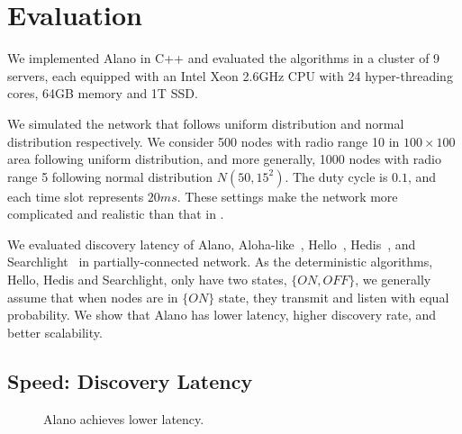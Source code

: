 \section{Evaluation}
\label{Evaluation}


We implemented Alano in C++ and evaluated the algorithms in a cluster of 9 servers, 
each equipped with an Intel Xeon 2.6GHz CPU with 24 hyper-threading cores, 64GB memory and 1T SSD. 

We simulated the network that follows uniform distribution and normal distribution respectively. 
We consider 500 nodes with radio range 10 in $100\times100$ area following uniform distribution, 
and more generally, 1000 nodes with radio range 5 following normal distribution $N(50, 15^2)$. 
The duty cycle is $0.1$, and each time slot represents $20ms$. 
These settings make the network more complicated and realistic than that in 
\cite{wang2015blinddate, qiu2016talk, sun2014hello, bakht2012searchlight, 
chen2015heterogeneous, kandhalu2010u, you2011aloha, 
mcglynn2001birthday, song2014probabilistic, vasudevan2009neighbor}.



We evaluated discovery latency of Alano, Aloha-like~\cite{you2011aloha}, Hello~\cite{sun2014hello}, Hedis~\cite{chen2015heterogeneous}, and Searchlight~\cite{bakht2012searchlight} in partially-connected network. As the deterministic algorithms, Hello, Hedis and Searchlight, only have two states, $\{ON, OFF\}$, we generally assume that when nodes are in $\{ON\}$ state, they transmit and listen with equal probability.
We show that Alano has lower latency, higher discovery rate, and better scalability.

\subsection{Speed: Discovery Latency}

\begin{figure}[!h]
\centering
{}
\hspace{0.01in}
\caption{Alano achieves lower latency.}
\label{fig_latency}
\end{figure}

